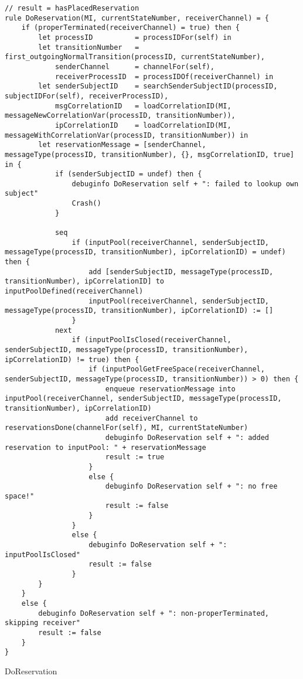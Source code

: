 \begin{listing}[H]
\begin{verbatim}
// result = hasPlacedReservation
rule DoReservation(MI, currentStateNumber, receiverChannel) = {
    if (properTerminated(receiverChannel) = true) then {
        let processID          = processIDFor(self) in
        let transitionNumber   = first_outgoingNormalTransition(processID, currentStateNumber),
            senderChannel      = channelFor(self),
            receiverProcessID  = processIDOf(receiverChannel) in
        let senderSubjectID    = searchSenderSubjectID(processID, subjectIDFor(self), receiverProcessID),
            msgCorrelationID   = loadCorrelationID(MI, messageNewCorrelationVar(processID, transitionNumber)),
            ipCorrelationID    = loadCorrelationID(MI, messageWithCorrelationVar(processID, transitionNumber)) in
        let reservationMessage = [senderChannel, messageType(processID, transitionNumber), {}, msgCorrelationID, true] in {
            if (senderSubjectID = undef) then {
                debuginfo DoReservation self + ": failed to lookup own subject"
                Crash()
            }

            seq
                if (inputPool(receiverChannel, senderSubjectID, messageType(processID, transitionNumber), ipCorrelationID) = undef) then {
                    add [senderSubjectID, messageType(processID, transitionNumber), ipCorrelationID] to inputPoolDefined(receiverChannel)
                    inputPool(receiverChannel, senderSubjectID, messageType(processID, transitionNumber), ipCorrelationID) := []
                }
            next
                if (inputPoolIsClosed(receiverChannel, senderSubjectID, messageType(processID, transitionNumber), ipCorrelationID) != true) then {
                    if (inputPoolGetFreeSpace(receiverChannel, senderSubjectID, messageType(processID, transitionNumber)) > 0) then {
                        enqueue reservationMessage into inputPool(receiverChannel, senderSubjectID, messageType(processID, transitionNumber), ipCorrelationID)
                        add receiverChannel to reservationsDone(channelFor(self), MI, currentStateNumber)
                        debuginfo DoReservation self + ": added reservation to inputPool: " + reservationMessage
                        result := true
                    }
                    else {
                        debuginfo DoReservation self + ": no free space!"
                        result := false
                    }
                }
                else {
                    debuginfo DoReservation self + ": inputPoolIsClosed"
                    result := false
                }
        }
    }
    else {
        debuginfo DoReservation self + ": non-properTerminated, skipping receiver"
        result := false
    }
}
\end{verbatim}
\caption{DoReservation}
\label{lst:asm:DoReservation}
\end{listing}




